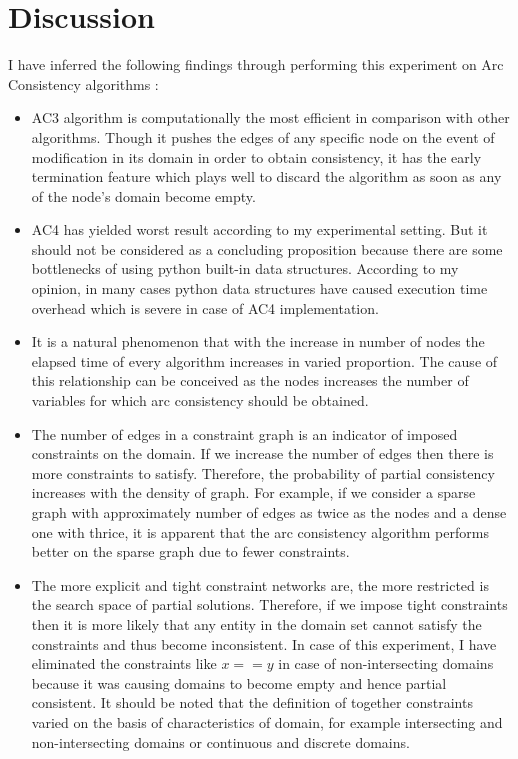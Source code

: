 \documentclass[10pt,twocolumn]{article}
\begin{document}
\section{Discussion}
I have inferred the following findings through performing this experiment on Arc Consistency algorithms :
\begin{itemize}
	\item AC3 algorithm is computationally the most efficient in comparison with other algorithms. Though it pushes the edges of any specific node on the event of modification in its domain in order to obtain consistency, it has the early termination feature which plays well to discard the algorithm as soon as any of the node's domain become empty.
	\item AC4 has yielded worst result according to my experimental setting. But it should not be considered as a concluding proposition because there are some bottlenecks of using python built-in data structures. According to my opinion, in many cases python data structures have caused execution time overhead which is severe in case of AC4 implementation.
	\item It is a natural phenomenon that with the increase in number of nodes the elapsed time of every algorithm increases in varied proportion. The cause of this relationship can be conceived as the nodes increases the number of variables for which arc consistency should be obtained.
	\item The number of edges in a constraint graph is an indicator of imposed constraints on the domain. If we increase the number of edges then there is more constraints to satisfy. Therefore, the probability of partial consistency increases with the density of graph. For example, if we consider a sparse graph with approximately number of edges as twice as the nodes and a dense one with thrice, it is apparent that the arc consistency algorithm performs better on the sparse graph due to fewer constraints.
	\item The more explicit and tight constraint networks are, the more restricted is the search space of partial solutions. Therefore, if we impose tight constraints then it is more likely that any entity in the domain set cannot satisfy the constraints and thus become inconsistent. In case of this experiment, I have eliminated the constraints like $ x == y $ in case of non-intersecting domains because it was causing domains to become empty and hence partial consistent. It should be noted that the definition of together constraints varied on the basis of characteristics of domain, for example intersecting and non-intersecting domains or continuous and discrete domains.

\end{itemize}
\end{document}
